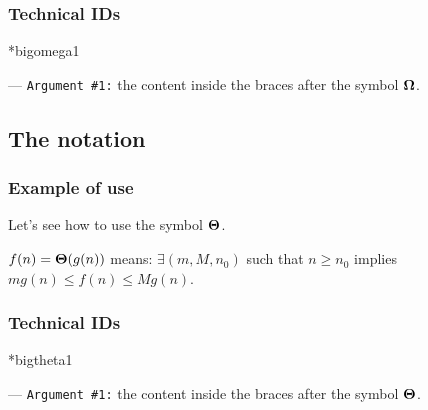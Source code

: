 \documentclass[12pt,a4paper]{article}
\makeatletter
\newcommand\IDmacro{\@ifstar{\@IDmacroStar}{\@IDmacroNoStar}}
\newcommand\@IDmacroNoStar[3]{%
        \texttt{%
        	\textbackslash#1%
        	\IfStrEq{#2}{0}{}{%
        		\,\,[#2 Option%
				\IfStrEq{#2}{1}{}{s}]%
			}%
    	    \,\,(#3 Argument%
				\IfStrEq{#3}{1}{}{s})%
	   	}
        \immediate\write\tempfile{macro@#1@#2@#3}%
    }
\newcommand\@IDmacroStar[2]{%
        \@IDmacroNoStar{#1}{0}{#2}%
    }
\newcommand\@IDoptarg[2]{%
    	\vspace{0.5em}
		--- \texttt{#1 \##2:}%
	}
\newcommand\IDarg[1]{%
    	\@IDoptarg{Argument}{#1}%
	}
\newcommand\@bigtAsymptoricOpe[2]{%
        \ensuremath{%
            \if\relax\detokenize{#2}\relax
                #1%
            \else
                \mathop{}\mathopen{}#1\mathopen{}\left( #2 \right)%
            \fi
        }%
    }
\newcommand\bigomega[1]{%
        \@bigtAsymptoricOpe{\bm{\Omega}}{#1}%
    }
\newcommand\bigtheta[1]{%
        \@bigtAsymptoricOpe{\bm{\Theta}}{#1}%
    }
\makeatother
\begin{document}
		\subsubsection{Technical IDs}

\IDmacro*{bigomega}{1}

\IDarg{1} the content inside the braces after the symbol $\bigomega{}$.



    \subsection{\texorpdfstring{The \textTheta{} notation}%
                               {The "big Theta" notation}}

		\subsubsection{Example of use}

\begin{tcblisting}{}
Let's see how to use the symbol $\bigtheta{}$.

$f(n) = \bigtheta{g(n)}$ means: $\exists (m, M, n_0)$ such that
$n \geqslant n_0$ implies $m g(n) \leqslant f(n) \leqslant M g(n)$.
\end{tcblisting}


		\subsubsection{Technical IDs}

\IDmacro*{bigtheta}{1}

\IDarg{1} the content inside the braces after the symbol $\bigtheta{}$.
\end{document}
